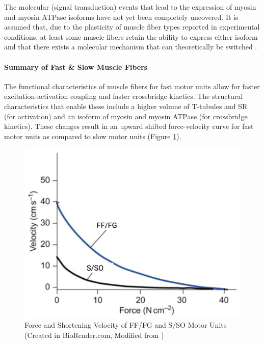 The molecular (signal transduction) events that lead to the expression of myosin and myosin ATPase isoforms have not yet been completely uncovered.\footnotemark{} It is assumed that, due to the plasticity of muscle fiber types reported in experimental conditions, at least some muscle fibers retain the ability to express either isoform and that there exists a molecular mechanism that can theoretically be switched \cite{schiaffino_molecular_1996}.

\paragraph{Summary of Fast \& Slow Muscle Fibers}
The functional characteristics of muscle fibers for fast motor units allow for faster excitation-activation coupling and faster crossbridge kinetics. The structural characteristics that enable these include a higher volume of T-tubules and SR (for activation) and an isoform of myosin and myosin ATPase (for crossbridge kinetics). These changes result in an upward shifted force-velocity curve for fast motor units as compared to slow motor units (Figure \ref{fig:fiber_type_FV}). 

\begin{figure}[h]
    \centering
    \includegraphics[width=1\linewidth]{./figure/fiber_type_FV.png}
    \caption{Force and Shortening Velocity of FF/FG and S/SO Motor Units \footnotesize{(Created in BioRender.com, Modified from \cite{feher_quantitative_2017})}}
    \label{fig:fiber_type_FV}
\end{figure}


